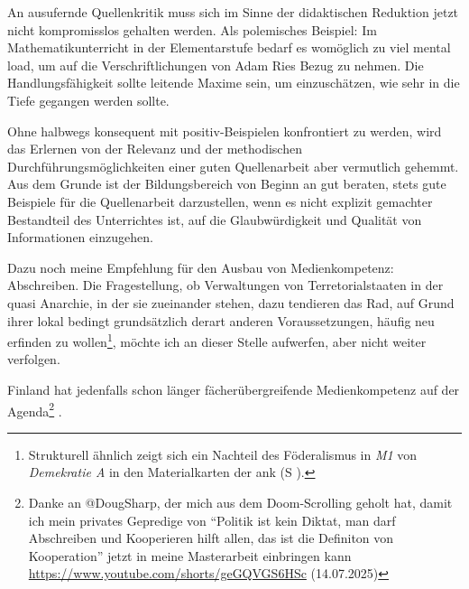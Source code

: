 An ausufernde Quellenkritik muss sich im Sinne der didaktischen Reduktion jetzt nicht kompromisslos gehalten werden.
Als polemisches Beispiel: Im Mathematikunterricht in der Elementarstufe bedarf es womöglich zu viel mental load, um auf die Verschriftlichungen von Adam Ries Bezug zu nehmen. Die Handlungsfähigkeit sollte leitende Maxime sein, um einzuschätzen, wie sehr in die Tiefe gegangen werden sollte. 

Ohne halbwegs konsequent mit positiv-Beispielen konfrontiert zu werden, wird das Erlernen von der Relevanz und der methodischen Durchführungsmöglichkeiten einer guten Quellenarbeit aber vermutlich gehemmt. Aus dem Grunde ist der Bildungsbereich von Beginn an gut beraten, stets gute Beispiele für die Quellenarbeit darzustellen, wenn es nicht explizit gemachter Bestandteil des Unterrichtes ist, auf die Glaubwürdigkeit und Qualität von Informationen einzugehen. 



\bigskip

Dazu noch meine Empfehlung für den Ausbau von Medienkompetenz: Abschreiben. Die Fragestellung, ob Verwaltungen von Terretorialstaaten in der quasi Anarchie, in der sie zueinander stehen, dazu tendieren das Rad, auf Grund ihrer lokal bedingt grundsätzlich derart anderen Voraussetzungen,  häufig neu erfinden zu wollen\footnote{
    Strukturell ähnlich zeigt sich ein Nachteil des Föderalismus in \emph{M1} von \emph{Demekratie A} in den Materialkarten der \gls{ank} (\gls{S} \pageref{DEMOKRATIE-A3}).}, 
möchte ich an dieser Stelle aufwerfen, aber nicht weiter verfolgen. 

\noindent Finland hat jedenfalls schon länger fächerübergreifende Medienkompetenz auf der Agenda\footnote{
    Danke an @DougSharp, der mich aus dem Doom-Scrolling geholt hat, damit ich mein privates Gepredige von \enquote{Politik ist kein Diktat, man darf Abschreiben und Kooperieren hilft allen, das ist die Definiton von Kooperation} jetzt in meine Masterarbeit einbringen kann \url{https://www.youtube.com/shorts/geGQVGS6HSc} (14.07.2025)
} \autocites(\gls{vgl} überblicksweise \gls{zb})(){Palsa.2015}{Salomaa.2019}. 


